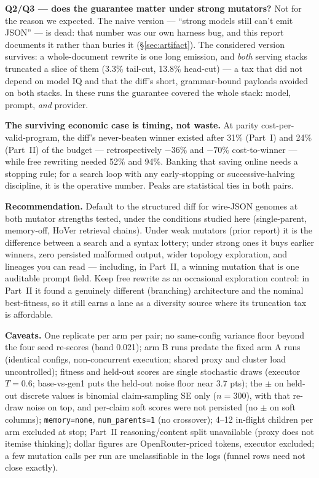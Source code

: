 \documentclass[11pt]{article}
\newcommand{\armA}{\textcolor{bad}{arm A}}
\newcommand{\armB}{\textcolor{accent}{arm B}}
\begin{document}
\medskip\noindent\textbf{Q2/Q3 --- does the guarantee matter under strong mutators?} Not for the
reason we expected. The naive version --- ``strong models still can't emit JSON'' --- is dead:
that number was our own harness bug, and this report documents it rather than buries it
(\S\ref{sec:artifact}). The considered version survives: a whole-document rewrite is one long
emission, and \emph{both} serving stacks truncated a slice of them (3.3\% tail-cut, 13.8\%
head-cut) --- a tax that did not depend on model IQ and that the diff's short, grammar-bound
payloads avoided on both stacks. In these runs the guarantee covered the whole stack: model,
prompt, \emph{and} provider.

\medskip\noindent\textbf{The surviving economic case is timing, not waste.} At parity
cost-per-valid-program, the diff's never-beaten winner existed after 31\% (Part~I) and 24\%
(Part~II) of the budget --- retrospectively $-36\%$ and $-70\%$ cost-to-winner --- while free
rewriting needed 52\% and 94\%. Banking that saving online needs a stopping rule; for a search
loop with any early-stopping or successive-halving discipline, it is the operative number. Peaks are statistical ties in both pairs.

\medskip\noindent\textbf{Recommendation.} Default to the structured diff for wire-JSON genomes
at both mutator strengths tested, under the conditions studied here (single-parent, memory-off,
HoVer retrieval chains). Under weak mutators (prior report) it is the difference between a
search and a syntax lottery; under strong ones it buys earlier winners, zero persisted malformed
output, wider topology exploration, and lineages you can read --- including, in Part~II, a
winning mutation that is one auditable prompt field. Keep free rewrite as an occasional
exploration control: in Part~II it found a genuinely different (branching) architecture and the
nominal best-fitness, so it still earns a lane as a diversity source where its truncation tax is
affordable.

\medskip\noindent\textbf{Caveats.} One replicate per arm per pair; no same-config variance floor
beyond the four seed re-scores (band 0.021); \armB{} runs predate the fixed \armA{} runs
(identical configs, non-concurrent execution; shared proxy and cluster load uncontrolled); fitness and held-out scores are single stochastic
draws (executor $T{=}0.6$; base-vs-gen1 puts the held-out noise floor near 3.7 pts); the $\pm$
on held-out discrete values is binomial claim-sampling SE only ($n=300$), with that re-draw
noise on top, and per-claim soft scores were not persisted (no $\pm$ on soft columns);
\texttt{memory=none}, \texttt{num\_parents=1} (no crossover); 4--12 in-flight children per arm
excluded at stop; Part~II reasoning/content split unavailable (proxy does not itemise thinking);
dollar figures are OpenRouter-priced tokens, executor excluded; a few mutation calls per run
are unclassifiable in the logs (funnel rows need not close exactly).
\end{document}
